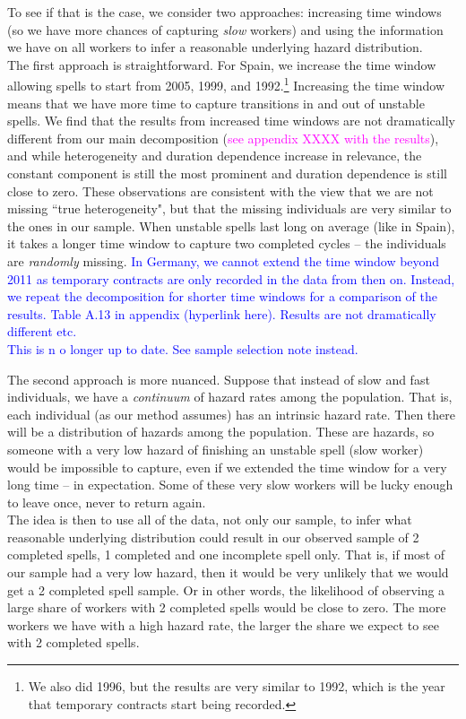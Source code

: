 \documentclass[12pt]{article}
\theoremstyle{definition}
\theoremstyle{remark}
\begin{document}
To see if that is the case, we consider two approaches: increasing time windows (so we have more chances of capturing \textit{slow} workers) and using the information we have on all workers to infer a reasonable underlying hazard distribution.\\

The first approach is straightforward. For Spain, we increase the time window allowing spells to start from 2005, 1999, and 1992.\footnote{We also did 1996, but the results are very similar to 1992, which is the year that temporary contracts start being recorded.} Increasing the time window means that we have more time to capture transitions in and out of unstable spells. We find that the results from increased time windows are not dramatically different from our main decomposition (\textcolor{magenta}{see appendix XXXX with the results}), and while heterogeneity and duration dependence increase in relevance, the constant component is still the most prominent and duration dependence is still close to zero. These observations are consistent with the view that we are not missing ``true heterogeneity", but that the missing individuals are very similar to the ones in our sample. When unstable spells last long on average (like in Spain), it takes a longer time window to capture two completed cycles -- the individuals are \textit{randomly} missing. \textcolor{blue}{In Germany, we cannot extend the time window beyond 2011 as temporary contracts are only recorded in the data from then on. Instead, we repeat the decomposition for shorter time windows for a comparison of the results. Table A.13 in appendix (hyperlink here). Results are not dramatically different etc.}\\

\textcolor{blue}{This is n o longer up to date. See sample selection note instead.}

The second approach is more nuanced. Suppose that instead of slow and fast individuals, we have a \textit{continuum} of hazard rates among the population. That is, each individual (as our method assumes) has an intrinsic hazard rate. Then there will be a distribution of hazards among the population. These are hazards, so someone with a very low hazard of finishing an unstable spell (slow worker) would be impossible to capture, even if we extended the time window for a very long time -- in expectation. Some of these very slow workers will be lucky enough to leave once, never to return again.\\

The idea is then to use all of the data, not only our sample, to infer what reasonable underlying distribution could result in our observed sample of 2 completed spells, 1 completed and one incomplete spell only. That is, if most of our sample had a very low hazard, then it would be very unlikely that we would get a 2 completed spell sample. Or in other words, the likelihood of observing a large share of workers with 2 completed spells would be close to zero. The more workers we have with a high hazard rate, the larger the share we expect to see with 2 completed spells.\\
\end{document}

